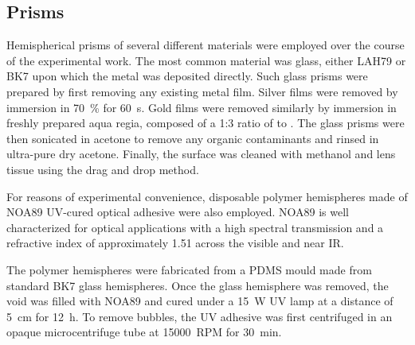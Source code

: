 \subsection{Prisms}
Hemispherical prisms of several different materials were employed over the
course of the experimental work.  The most common material was glass,
either LAH79 or BK7 upon which the metal was deposited directly.  Such
glass prisms were prepared by first removing any existing metal film.
Silver films were removed by immersion in \SI{70}{\percent}  for
\SI{60}{\second}.  Gold films were removed similarly by immersion in
freshly prepared aqua regia, composed of a 1:3 ratio of  to
.  The glass prisms were then sonicated in acetone to remove any
organic contaminants and rinsed in ultra-pure dry acetone.  Finally, the
surface was cleaned with methanol and lens tissue using the drag and drop
method.

For reasons of experimental convenience, disposable polymer hemispheres made of
NOA89 UV-cured optical adhesive were also employed.  NOA89 is well
characterized for optical applications with a high spectral transmission 
and a refractive index of approximately 1.51 across the visible and near
IR.

The polymer hemispheres were fabricated from a PDMS mould made from
standard BK7 glass hemispheres. Once the glass hemisphere was removed, the
void was filled with NOA89 and cured under a \SI{15}{\watt} UV lamp at a
distance of \SI{5}{\centi\meter} for \SI{12}{\hour}.  To remove bubbles,
the UV adhesive was first centrifuged in an opaque microcentrifuge tube at
\SI{15000}{RPM} for \SI{30}{\minute}.
